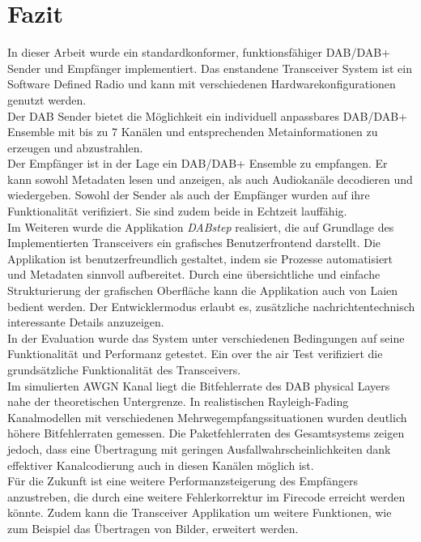 \chapter{Fazit}\label{chapter:conclusion}
In dieser Arbeit wurde ein standardkonformer, funktionsfähiger DAB/DAB+ Sender und Empfänger implementiert. Das enstandene Transceiver System ist ein Software Defined Radio und kann mit verschiedenen Hardwarekonfigurationen genutzt werden.\\
Der DAB Sender bietet die Möglichkeit ein individuell anpassbares DAB/DAB+ Ensemble mit bis zu 7 Kanälen und entsprechenden Metainformationen zu erzeugen und abzustrahlen.\\
Der Empfänger ist in der Lage ein DAB/DAB+ Ensemble zu empfangen. Er kann sowohl Metadaten lesen und anzeigen, als auch Audiokanäle decodieren und wiedergeben.
Sowohl der Sender als auch der Empfänger wurden auf ihre Funktionalität verifiziert. Sie sind zudem beide in Echtzeit lauffähig.\\
Im Weiteren wurde die Applikation \textit{DABstep} realisiert, die auf Grundlage des Implementierten Transceivers ein grafisches Benutzerfrontend darstellt. Die Applikation ist benutzerfreundlich gestaltet, indem sie Prozesse automatisiert und Metadaten sinnvoll aufbereitet. Durch eine übersichtliche und einfache Strukturierung der grafischen Oberfläche kann die Applikation auch von Laien bedient werden. Der Entwicklermodus erlaubt es, zusätzliche nachrichtentechnisch interessante Details anzuzeigen.\\

In der Evaluation wurde das System unter verschiedenen Bedingungen auf seine Funktionalität und Performanz getestet. Ein over the air Test verifiziert die grundsätzliche Funktionalität des Transceivers.\\
Im simulierten AWGN Kanal liegt die Bitfehlerrate des DAB physical Layers nahe der theoretischen Untergrenze. In realistischen Rayleigh-Fading Kanalmodellen mit verschiedenen Mehrwegempfangssituationen wurden deutlich höhere Bitfehlerraten gemessen. Die Paketfehlerraten des Gesamtsystems zeigen jedoch, dass eine Übertragung mit geringen Ausfallwahrscheinlichkeiten dank effektiver Kanalcodierung auch in diesen Kanälen möglich ist.\\
Für die Zukunft ist eine weitere Performanzsteigerung des Empfängers anzustreben, die durch eine weitere Fehlerkorrektur im Firecode erreicht werden könnte. Zudem kann die Transceiver Applikation um weitere Funktionen, wie zum Beispiel das Übertragen von Bilder, erweitert werden.

